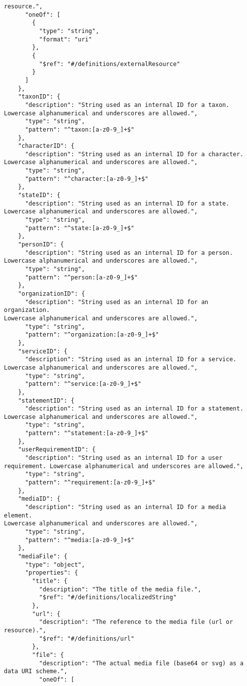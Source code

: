 \documentclass[10pt,letterpaper]{article}
\begin{document}
\begin{verbatim}
resource.",
      "oneOf": [
        {
          "type": "string",
          "format": "uri"
        },
        {
          "$ref": "#/definitions/externalResource"
        }
      ]
    },
    "taxonID": {
      "description": "String used as an internal ID for a taxon.
Lowercase alphanumerical and underscores are allowed.",
      "type": "string",
      "pattern": "^taxon:[a-z0-9_]+$"
    },
    "characterID": {
      "description": "String used as an internal ID for a character.
Lowercase alphanumerical and underscores are allowed.",
      "type": "string",
      "pattern": "^character:[a-z0-9_]+$"
    },
    "stateID": {
      "description": "String used as an internal ID for a state.
Lowercase alphanumerical and underscores are allowed.",
      "type": "string",
      "pattern": "^state:[a-z0-9_]+$"
    },
    "personID": {
      "description": "String used as an internal ID for a person.
Lowercase alphanumerical and underscores are allowed.",
      "type": "string",
      "pattern": "^person:[a-z0-9_]+$"
    },
    "organizationID": {
      "description": "String used as an internal ID for an organization.
Lowercase alphanumerical and underscores are allowed.",
      "type": "string",
      "pattern": "^organization:[a-z0-9_]+$"
    },
    "serviceID": {
      "description": "String used as an internal ID for a service.
Lowercase alphanumerical and underscores are allowed.",
      "type": "string",
      "pattern": "^service:[a-z0-9_]+$"
    },
    "statementID": {
      "description": "String used as an internal ID for a statement.
Lowercase alphanumerical and underscores are allowed.",
      "type": "string",
      "pattern": "^statement:[a-z0-9_]+$"
    },
    "userRequirementID": {
      "description": "String used as an internal ID for a user
requirement. Lowercase alphanumerical and underscores are allowed.",
      "type": "string",
      "pattern": "^requirement:[a-z0-9_]+$"
    },
    "mediaID": {
      "description": "String used as an internal ID for a media element.
Lowercase alphanumerical and underscores are allowed.",
      "type": "string",
      "pattern": "^media:[a-z0-9_]+$"
    },
    "mediaFile": {
      "type": "object",
      "properties": {
        "title": {
          "description": "The title of the media file.",
          "$ref": "#/definitions/localizedString"
        },
        "url": {
          "description": "The reference to the media file (url or
resource).",
          "$ref": "#/definitions/url"
        },
        "file": {
          "description": "The actual media file (base64 or svg) as a
data URI scheme.",
          "oneOf": [

\end{verbatim}
\end{document}
